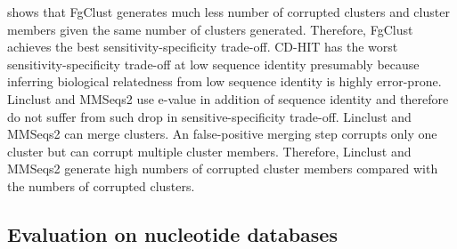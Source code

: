 \documentclass[11pt,letterpaper]{article}
\begin{document}
 shows that FgClust generates much less number of corrupted clusters and cluster members given the same number of clusters generated.
Therefore, FgClust achieves the best sensitivity-specificity trade-off.
CD-HIT has the worst sensitivity-specificity trade-off at low sequence identity presumably because inferring biological relatedness from low sequence identity is highly error-prone.
Linclust and MMSeqs2 use e-value in addition of sequence identity and therefore do not suffer from such drop in sensitive-specificity trade-off.
Linclust and MMSeqs2 can merge clusters.
An false-positive merging step corrupts only one cluster but can corrupt multiple cluster members.
Therefore, Linclust and MMSeqs2 generate high numbers of corrupted cluster members compared with the numbers of corrupted clusters.


\subsection{Evaluation on nucleotide databases}
\end{document}
